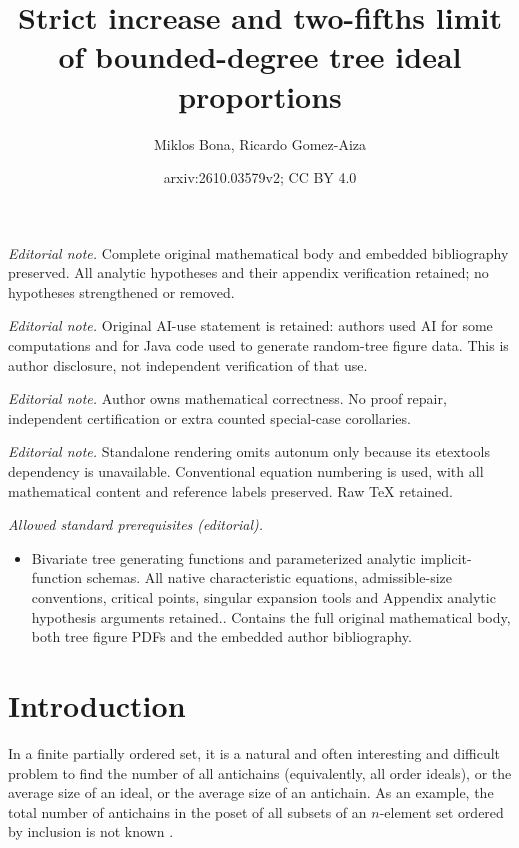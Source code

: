 \documentclass[10pt,a4paper]{amsart}
\title{Strict increase and two-fifths limit of bounded-degree tree ideal proportions}
\author{Miklos Bona, Ricardo Gomez-Aiza}
\date{arxiv:2610.03579v2; CC BY 4.0}
\theoremstyle{remark}
\begin{document}
\maketitle
\noindent\textit{Editorial note.} Complete original mathematical body and embedded bibliography preserved. All analytic hypotheses and their appendix verification retained; no hypotheses strengthened or removed.\par\medskip
\noindent\textit{Editorial note.} Original AI-use statement is retained: authors used AI for some computations and for Java code used to generate random-tree figure data. This is author disclosure, not independent verification of that use.\par\medskip
\noindent\textit{Editorial note.} Author owns mathematical correctness. No proof repair, independent certification or extra counted special-case corollaries.\par\medskip
\noindent\textit{Editorial note.} Standalone rendering omits autonum only because its etextools dependency is unavailable. Conventional equation numbering is used, with all mathematical content and reference labels preserved. Raw TeX retained.\par\medskip
\noindent\textit{Allowed standard prerequisites (editorial).}\begin{itemize}
\item Bivariate tree generating functions and parameterized analytic implicit-function schemas. All native characteristic equations, admissible-size conventions, critical points, singular expansion tools and Appendix analytic hypothesis arguments retained.. Contains the full original mathematical body, both tree figure PDFs and the embedded author bibliography.
\end{itemize}\medskip
\section{Introduction}
In a finite partially ordered set, it is a natural and often interesting and difficult problem to find the number of all antichains (equivalently, all order ideals), or the average size of an ideal, or the average size of an antichain. As an example, the total number of antichains in the poset of all subsets of an $n$-element set
ordered by inclusion is not known \cite{JenssenMalekshahianPark}.
\end{document}
